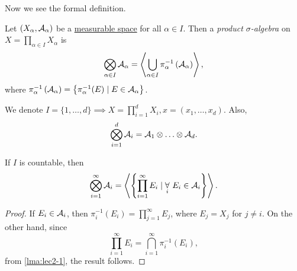 Now we see the formal definition.
\begin{definition}\label{def:product-sigma-algebra}
	Let \((X_\alpha , \mathcal{\MakeUppercase{a}} _\alpha )\) be a \hyperref[def:measurable-space]{measurable space} for all \(\alpha \in I\).
	Then a \emph{product \(\sigma\)-algebra} on \(X = \prod\limits_{\alpha \in I} X_\alpha \) is
	\[
		\bigotimes_{\alpha \in I}\mathcal{\MakeUppercase{a}} _\alpha = \left< \bigcup\limits_{\alpha \in I} \pi ^{-1} _{\alpha }\left(\mathcal{\MakeUppercase{a}} _\alpha \right)  \right>,
	\]
	where \(\pi ^{-1} _\alpha \left(\mathcal{\MakeUppercase{a}} _\alpha \right) = \left\{\pi ^{-1} _\alpha (E) \mid E\in \mathcal{\MakeUppercase{a}} _\alpha \right\}\).
\end{definition}

\begin{notation}
	We denote \(I = \{1, \ldots , d\} \implies X = \prod\limits_{i=1}^{d} X_{i}, x = (x_1, \ldots , x_d )\). Also,
	\[
		\bigotimes_{i = 1}^d \mathcal{\MakeUppercase{a}} _{i} = \mathcal{\MakeUppercase{a}} _1\otimes \ldots \otimes \mathcal{\MakeUppercase{a}} _d.
	\]
\end{notation}

\begin{lemma}
	If \(I\) is countable, then
	\[
		\bigotimes_{i = 1}^{\infty}\mathcal{\MakeUppercase{a}} _{i} = \left< \left\{\prod\limits_{i = 1}^{\infty} E_{i} \mid \underset{i}{\forall }\ E_{i}\in \mathcal{\MakeUppercase{a}} _{i}\right\} \right>.
	\]
\end{lemma}
\begin{proof}
	If \(E_i \in \mathcal{\MakeUppercase{a}} _{i}\), then \(\pi ^{-1} _{i} (E_{i} ) = \prod\limits_{j=1}^{\infty } E_{j}\), where \(E_{j} = X_j\) for \(j\neq i\). On the other hand, since
	\[
		\prod\limits_{i=1}^{\infty } E_{i} = \bigcap\limits_{i=1}^{\infty } \pi ^{-1} _{i} (E_{i} ),
	\]
	from \autoref{lma:lec2-1}, the result follows.
\end{proof}